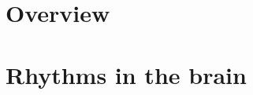\documentclass[main.tex]{subfiles}
\begin{document}
\section{Overview}
  
\section{Rhythms in the brain}\label{intro_rhythms}
  
\end{document}
